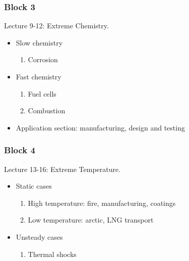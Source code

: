 \subsubsection{Block 3}
Lecture 9-12: Extreme Chemistry.
\begin{itemize}
    \item Slow chemistry
          \begin{enumerate}
              \item Corrosion
          \end{enumerate}
    \item Fast chemistry
          \begin{enumerate}
              \item Fuel cells
              \item Combustion
          \end{enumerate}
    \item Application section: manufacturing, design and testing
\end{itemize}
\subsubsection{Block 4}
Lecture 13-16: Extreme Temperature.
\begin{itemize}
    \item Static cases
          \begin{enumerate}
              \item High temperature: fire, manufacturing, coatings
              \item Low temperature: arctic, LNG transport
          \end{enumerate}
    \item Unsteady cases
          \begin{enumerate}
              \item Thermal shocks
          \end{enumerate}
\end{itemize}
